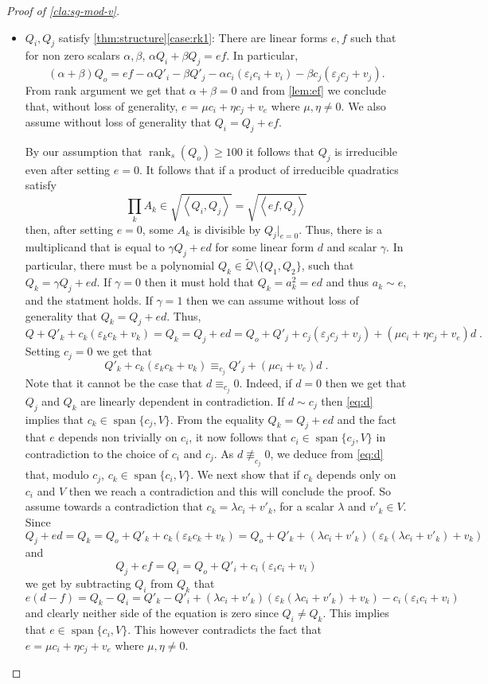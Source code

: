 \documentclass[10pt,a4paper]{article}
\def\rank{\operatorname{rank}}
\newcommand{\cQ}{{\mathcal{Q}}}
\newcommand{\ideal}[1]{\left \langle{#1}\right \rangle}
\newcommand{\spn}[1]{\operatorname{span}\{{#1}\}}
\def\epsilon{\varepsilon}
\newcommand{\rkq}{100}
\begin{document}
\begin{proof}[Proof of \autoref{cla:sg-mod-v}]
\begin{itemize}
\item $Q_i,Q_j$ satisfy \autoref{thm:structure}\ref{case:rk1}: 
There are linear forms $e,f$ such that for non zero scalars $\alpha,\beta$, $\alpha Q_i + \beta Q_j = ef$. In particular, 
\[(\alpha + \beta ) Q_o = ef - \alpha Q'_i - \beta Q'_j - \alpha c_i(\epsilon_i c_i + v_i ) - \beta c_j(\epsilon_j c_j + v_j).\]
From rank argument we get that $\alpha+ \beta = 0$ and from \autoref{lem:ef} we conclude that, without loss of generality, $e = \mu c_i + \eta c_j +v_e$ where $\mu, \eta \neq 0$. We also assume without loss of generality that $Q_i=Q_j+ef$.


By our assumption that $\rank_s(Q_o)\geq \rkq$ it follows that $Q_j$ is irreducible even after setting $e=0$. It follows that if a product of irreducible quadratics satisfy $$\prod_k A_k \in \sqrt{\ideal{Q_i,Q_j}} = \sqrt{\ideal{ef,Q_j}}$$ then, after setting $e=0$, some $A_k$ is divisible by ${Q_j}|_{e=0}$. Thus, there is a multiplicand that is equal to $ \gamma Q_j + ed$ for some linear form $d$ and scalar $\gamma$. In particular, there must be a polynomial $Q_k \in \tilde\cQ\setminus\{Q_1,Q_2\}$, such that  $Q_k = \gamma Q_j + ed$. If $\gamma = 0$ then it must hold that $Q_k = a_k^2 = ed$ and thus $a_k \sim e$, and the statment holds. If $\gamma = 1$ then we can assume without loss of generality that $Q_k =  Q_j + ed$. Thus,
$$ Q + Q'_k + c_k(\epsilon_k c_k + v_k) = Q_k =  Q_j + ed = Q_o+ Q'_j +  c_j(\epsilon_j c_j + v_j) + (\mu c_i + \eta c_j + v_e)d \;.$$ 
Setting $c_j=0$ we get that 
\begin{equation}\label{eq:d}
Q'_k + c_k(\epsilon_k c_k +v_k) \equiv_{c_j} Q'_j + (\mu c_i + v_e) d \;.
\end{equation}
Note that it cannot be the case that $d\equiv_{c_j}0$. Indeed, if $d=0$ then we get that $Q_j$ and $Q_k$ are linearly dependent in contradiction. If $d \sim c_j$ then  \eqref{eq:d} implies that $c_k\in\spn{c_j,V}$. From the equality  $Q_k = Q_j + ed$ and the fact that $e$ depends non trivially on $c_i$, it now follows that $c_i \in \spn{c_j,V}$ in contradiction to the choice of $c_i$ and $c_j$. As $d\not\equiv_{c_j}0$, we deduce from \eqref{eq:d} that, modulo $c_j$, $c_k \in \spn{c_i, V}$. We next show that if $c_k$ depends only on $c_i$ and $V$ then we reach a contradiction and this will conclude the proof. So assume towards a contradiction that $c_k = \lambda c_i + v'_k$, for a scalar $\lambda$ and $v'_k\in V$.  Since $$Q_j + ed=Q_k = Q_o+ Q'_k + c_k(\epsilon_k c_k + v_k ) = Q_o+Q'_k+ ( \lambda c_i + v'_k)\left(\epsilon_k  ( \lambda c_i + v'_k) + v_k\right) $$ and $$Q_j + ef = Q_i = Q_o +Q'_i + c_i(\epsilon_i c_i + v_i) $$ we get by subtracting $Q_i$ from $Q_k$ that 
\[
  e(d-f)   = Q_k-Q_i = Q'_k - Q'_i + ( \lambda c_i + v'_k)\left(\epsilon_k  ( \lambda c_i + v'_k) + v_k\right) -c_i(\epsilon_i c_i + v_i) 
\]
and clearly neither side of the equation is zero since $Q_i\neq Q_k$. 
This implies that $e \in \spn{c_i,V}$. This however contradicts the fact that  $e = \mu c_i + \eta c_j +v_e$ where $\mu, \eta \neq 0$. 
\end{itemize}


\end{proof}
\end{document}
